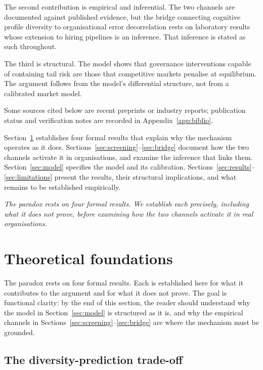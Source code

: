 \documentclass[11pt,a4paper]{article}
\newcommand{\bridgeskip}{\vspace{6pt}}
\begin{document}
The second contribution is empirical and inferential. The two channels are
documented against published evidence, but the bridge connecting cognitive
profile diversity to organisational error decorrelation rests on laboratory
results~\cite{keck_psychsci_2020} whose extension to hiring pipelines is an
inference. That inference is stated as such throughout.

The third is structural. The model shows that governance interventions capable
of containing tail risk are those that competitive markets penalise at
equilibrium. The argument follows from the model's differential structure,
not from a calibrated market model.

Some sources cited below are recent preprints or industry reports; publication
status and verification notes are recorded in Appendix~\ref{app:biblio}.

Section~\ref{sec:theory} establishes four formal results that explain why the
mechanism operates as it does.
Sections~\ref{sec:screening}--\ref{sec:bridge} document how the two channels
activate it in organisations, and examine the inference that links them.
Section~\ref{sec:model} specifies the model and its calibration.
Sections~\ref{sec:results}--\ref{sec:limitations} present the results, their
structural implications, and what remains to be established empirically.

\bridgeskip
\noindent\textit{The paradox rests on four formal results. We establish each
precisely, including what it does not prove, before examining how the two
channels activate it in real organisations.}

\section{Theoretical foundations}\label{sec:theory}

The paradox rests on four formal results. Each is established here for what it
contributes to the argument and for what it does not prove. The goal is
functional clarity: by the end of this section, the reader should understand
why the model in Section~\ref{sec:model} is structured as it is, and why the
empirical channels in Sections~\ref{sec:screening}--\ref{sec:bridge} are where
the mechanism must be grounded.

\subsection{The diversity-prediction trade-off}
\end{document}
